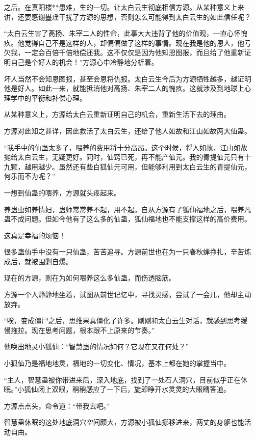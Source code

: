 \begin{this_body}
之后。在真阳楼**患难，生的一切。让太白云生彻底相信方源。从某种意义上来讲，还要感谢墨瑶干扰了方源的思想，否则怎么可能得到太白云生的如此信任呢？

“太白云生害了高扬、朱宰二人的性命，此事大大违背了他的价值观，一直心怀愧疚。他觉得自己不是这样的人，却偏偏做了这样的事情。现在我是他的恩人，他亏欠我，一定会百倍千倍地偿还我。这不仅仅是因为他知恩图报，而且给了他重新证明自己是个好人的机会！”方源心中冷静地分析着。

坏人当然不会知恩图报，甚至会恩将仇报。太白云生今后为方源牺牲越多，越证明他是好人。如此一来，就能抵消他对高扬、朱宰二人的愧疚。这就涉及到地球上心理学中的平衡和补偿心理。

从某种意义上，方源给太白云重新证明自己的机会，重新生活下去的理由。

方源对此知之甚详，因此救活了太白云生，还给了他人如故和江山如故两大仙蛊。

“我手中的仙蛊太多了，喂养的费用将十分高昂。这个时候，将人如故、江山如故抛给太白云生，无疑更好。同时，仙窍已死，再不能产仙元。我的青提仙元只有十九颗，越用越少。虽然还有些白狐仙元可用，但能够利用到太白云生的青提仙元，何乐而不为呢？”

一想到仙蛊的喂养，方源就头疼起来。

养蛊虫如养情妇，蛊师常常养不起，用不起。自从方源有了狐仙福地之后，喂养凡蛊不成问题。但如今他有了这么多的仙蛊，狐仙福地也不能支撑这样的高价费用。

这真是幸福的烦恼！

很多蛊仙手中没有一只仙蛊，苦苦追寻。方源前世也在为一只春秋蝉挣扎，辛苦炼成后，就被围剿自爆。

现在的方源，则在为如何喂养这么多仙蛊，而伤透脑筋。

方源一个人静静地坐着，试图从前世记忆中，寻找灵感，尝试了一会儿，他却主动放弃。

“唉，变成僵尸之后，思维果真僵化了许多。刚刚和太白云生对话，就感到思考缓慢拖拉。现在思考问题，根本跟不上原来的节奏。”

他唤出地灵小狐仙：“智慧蛊的情况如何？它现在又在何处？”

小狐仙乃是福地地灵，福地的一切变化、情况，基本上都在她的掌握当中。

“主人，智慧蛊被你带进来后，深入地底，找到了一处石人洞穴，目前似乎正在休眠。”小狐仙闭上双眼，稍稍感应了一下后，旋即睁开水灵灵的大眼睛答道。

方源点点头，命令道：“带我去吧。”

智慧蛊休眠的这处地底洞穴空间颇大，方源被小狐仙挪移进来，两丈的身躯也能活动自由。


\end{this_body}
